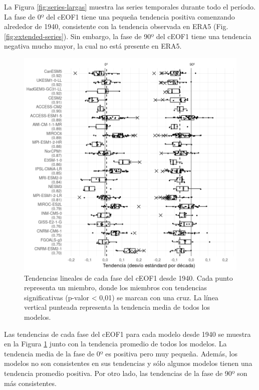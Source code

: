 \documentclass[12pt,oneside,a4paper]{reedthesis}
\begin{document}
La Figura \ref{fig:series-largas} muestra las series temporales durante todo el período.
La fase de 0º del cEOF1 tiene una pequeña tendencia positiva comenzando alrededor de 1940, consistente con la tendencia observada en ERA5 (Fig. \ref{fig:extended-series}).
Sin embargo, la fase de 90º del cEOF1 tiene una tendencia negativa mucho mayor, la cual no está presente en ERA5.

\begin{figure}

{\centering \includegraphics{figures/50-cmip6/trends-ceof1-1} 

}

\caption{Tendencias lineales de cada fase del cEOF1 desde 1940. Cada punto representa un miembro, donde los miembros con tendencias significativas (p-valor \textless{} 0,01) se marcan con una cruz. La línea vertical punteada representa la tendencia media de todos los modelos.}\label{fig:trends-ceof1}
\end{figure}



Las tendencias de cada fase del cEOF1 para cada modelo desde 1940 se muestra en la Figura \ref{fig:trends-ceof1} junto con la tendencia promedio de todos los modelos.
La tendencia media de la fase de 0º es positiva pero muy pequeña.
Además, los modelos no son consistentes en sus tendencias y sólo algunos modelos tienen una tendencia promedio positiva.
Por otro lado, las tendencias de la fase de 90º son más consistentes.
\end{document}
